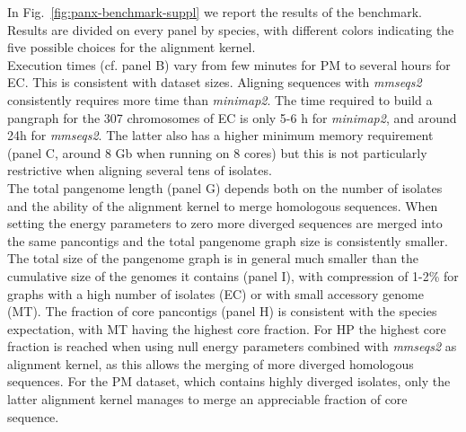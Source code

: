 \documentclass[aps,rmp,reprint,superscriptaddress,notitlepage,10pt,onecolumn]{revtex4-1}
\begin{document}
In Fig.~\ref{fig:panx-benchmark-suppl} we report the results of the benchmark. Results are divided on every panel by species, with different colors indicating the five possible choices for the alignment kernel.\\
Execution times (cf. panel B) vary from few minutes for PM to several hours for EC. This is consistent with dataset sizes. Aligning sequences with \textit{mmseqs2} consistently requires more time than \textit{minimap2}. The time required to build a pangraph for the 307 chromosomes of EC is only 5-6 h for \textit{minimap2}, and around 24h for \textit{mmseqs2}. The latter also has a higher minimum memory requirement (panel C, around 8 Gb when running on 8 cores) but this is not particularly restrictive when aligning several tens of isolates.\\
The total pangenome length (panel G) depends both on the number of isolates and the ability of the alignment kernel to merge homologous sequences. When setting the energy parameters to zero more diverged sequences are merged into the same pancontigs and the total pangenome graph size is consistently smaller. The total size of the pangenome graph is in general much smaller than the cumulative size of the genomes it contains (panel I), with compression of 1-2\% for graphs with a high number of isolates (EC) or with small accessory genome (MT). The fraction of core pancontigs (panel H) is consistent with the species expectation, with MT having the highest core fraction. For HP the highest core fraction is reached when using null energy parameters combined with \textit{mmseqs2} as alignment kernel, as this allows the merging of more diverged homologous sequences. For the PM dataset, which contains highly diverged isolates, only the latter alignment kernel manages to merge an appreciable fraction of core sequence.
\end{document}
